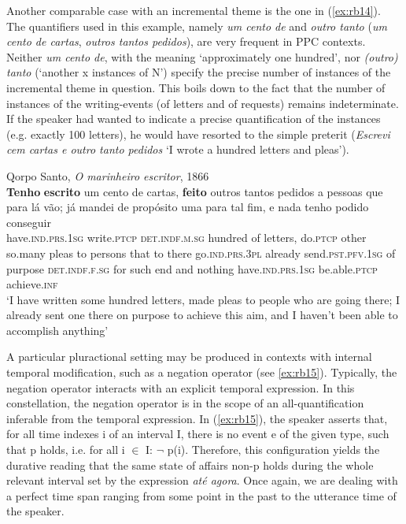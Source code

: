 \documentclass[output=paper,colorlinks,citecolor=brown]{langscibook}
\begin{document}
Another comparable case with an incremental theme is the one in (\ref{ex:rb14}). The quantifiers used in this example, namely \textit{um cento de} and \textit{outro tanto} (\textit{um cento de cartas}, \textit{outros tantos pedidos}), are very frequent in PPC contexts. Neither \textit{um cento de}, with the meaning ‘approximately one hundred’, nor \textit{(outro) tanto} (‘another x instances of N’) specify the precise number of instances of the incremental theme in question. This boils down to the fact that the number of instances of the writing-events (of letters and of requests) remains indeterminate. If the speaker had wanted to indicate a precise quantification of the instances (e.g. exactly 100 letters), he would have resorted to the simple preterit (\textit{Escrevi cem cartas e outro tanto pedidos} ‘I wrote a hundred letters and pleas’). 
  
\ea\label{ex:rb14}
Qorpo Santo, \textit{O marinheiro escritor}, 1866\\
\gll \textbf{Tenho} \textbf{escrito} um cento de cartas, \textbf{feito} outros tantos pedidos a pessoas que para lá vão; já mandei de propósito uma para tal fim, e nada tenho podido conseguir\\
have.\textsc{ind.prs.1sg} write.\textsc{ptcp} \textsc{det.indf.m.sg} hundred of letters, do.\textsc{ptcp} other so.many pleas to persons that to there go.\textsc{ind.prs.3pl} already send.\textsc{pst.pfv.1sg} of purpose \textsc{det.indf.f.sg} for such end and nothing have.\textsc{ind.prs.1sg} be.able.\textsc{ptcp} achieve.\textsc{inf}\\
\glt ‘I have written some hundred letters, made pleas to people who are going there; I already sent one there on purpose to achieve this aim, and I haven’t been able to accomplish anything’
\z

A particular pluractional setting may be produced in contexts with internal temporal modification, such as a negation operator (see \ref{ex:rb15}). Typically, the negation operator interacts with an explicit temporal expression. In this constellation, the negation operator is in the scope of an all-quantification inferable from the temporal expression. In (\ref{ex:rb15}), the speaker asserts that, for all time indexes i of an interval I, there is no event e of the given type, such that p holds, i.e. for all i $\in$ I: $\neg$ p(i). Therefore, this configuration yields the durative reading that the same state of affairs non-p holds during the whole relevant interval set by the expression \textit{até agora}. Once again, we are dealing with a perfect time span ranging from some point in the past to the utterance time of the speaker. 
\end{document}
